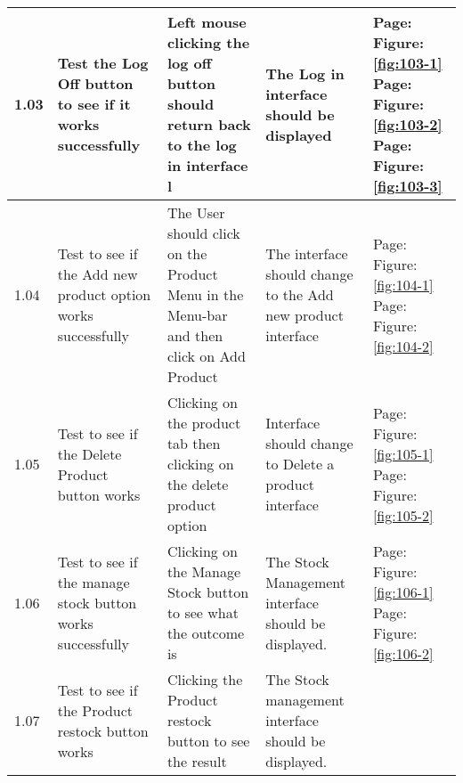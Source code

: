 \begin{flushleft}
\begin{longtable}{|p{1cm}|p{2.5cm}|p{2.5cm}|p{2cm}|p{2cm}|}
	1.03 & Test the Log Off button to see if it works successfully & Left mouse clicking the log off button should return back to the log in interface l & The Log in interface should be displayed &  Page:\pageref{fig:103-1}  \newline Figure:\ref{fig:103-1} \newline  \newline  Page:\pageref{fig:103-2}  \newline Figure:\ref{fig:103-2}  \newline  \newline  Page:\pageref{fig:103-3}  \newline Figure:\ref{fig:103-3}\\ \hline
	1.04 & Test to see if the Add new product option works successfully & The User should click on the Product Menu in the Menu-bar and then click on Add Product &  The interface should change to the Add new product interface& Page:\pageref{fig:104-1}  \newline Figure:\ref{fig:104-1} \newline  \newline Page:\pageref{fig:104-2}  \newline Figure:\ref{fig:104-2}\\ \hline
	1.05 & Test to see if the Delete Product button works & Clicking on the product tab then clicking on the delete product option & Interface should change to Delete a product interface&  Page:\pageref{fig:105-1}  \newline Figure:\ref{fig:105-1} \newline  \newline Page:\pageref{fig:105-2}  \newline Figure:\ref{fig:105-2}\\ \hline
	1.06 & Test to see if the manage stock button works successfully & Clicking on the Manage Stock button to see what the outcome is & The Stock Management interface should be displayed. &  Page:\pageref{fig:106-1}  \newline Figure:\ref{fig:106-1} \newline  \newline Page:\pageref{fig:106-2}  \newline Figure:\ref{fig:106-2}\\ \hline
	\rowcolor{dark-grey}1.07 & Test to see if the Product restock button works & Clicking the Product restock button to see the result & The Stock management interface should be displayed. & \\ \hline

\end{longtable}
\end{flushleft}
